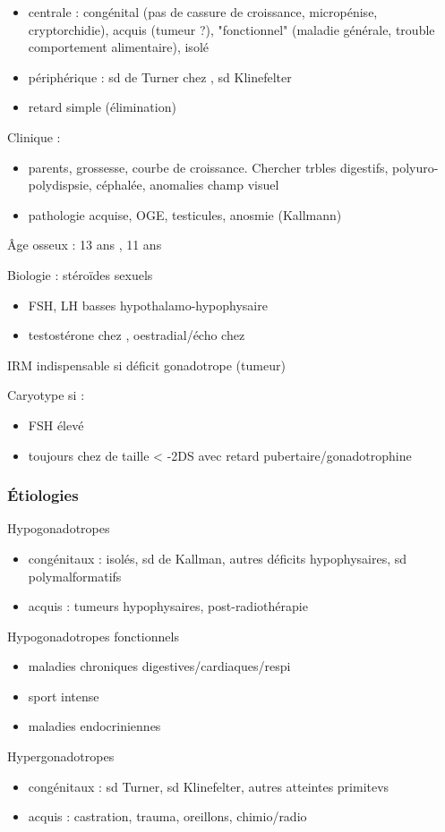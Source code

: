 \documentclass[11pt]{article}
\begin{document}
\begin{itemize}
\item centrale : congénital (pas de cassure de croissance, micropénise,
cryptorchidie), acquis (tumeur ?), "fonctionnel" (maladie générale, trouble
comportement alimentaire), isolé
\item périphérique : sd de Turner chez \female, sd Klinefelter \male
\item retard simple (élimination)
\end{itemize}

Clinique : 
\begin{itemize}
\item parents, grossesse, courbe de croissance. Chercher trbles digestifs, polyuro-polydispsie, céphalée, anomalies champ visuel
\item pathologie acquise, OGE, testicules, anosmie (Kallmann)
\end{itemize}

Âge osseux : 13 ans \male, 11 ans \female

Biologie : stéroïdes sexuels
\begin{itemize}
\item FSH, LH basses \thus hypothalamo-hypophysaire
\item testostérone chez \male, oestradial/écho chez \female
\end{itemize}

IRM indispensable si déficit gonadotrope (tumeur) \danger

Caryotype si :
\begin{itemize}
\item FSH élevé
\item toujours chez \female{} de taille < -2DS avec retard pubertaire/gonadotrophine \inc
\end{itemize}

\subsubsection{Étiologies}
\label{sec:org0682bc6}
Hypogonadotropes
\begin{itemize}
\item congénitaux : isolés, sd de Kallman, autres déficits hypophysaires, sd
polymalformatifs
\item acquis : tumeurs hypophysaires, post-radiothérapie
\end{itemize}
Hypogonadotropes fonctionnels
\begin{itemize}
\item maladies chroniques digestives/cardiaques/respi
\item sport intense
\item maladies endocriniennes
\end{itemize}
Hypergonadotropes
\begin{itemize}
\item congénitaux : sd Turner, sd Klinefelter, autres atteintes primitevs
\item acquis : castration, trauma, oreillons, chimio/radio
\end{itemize}
\end{document}
